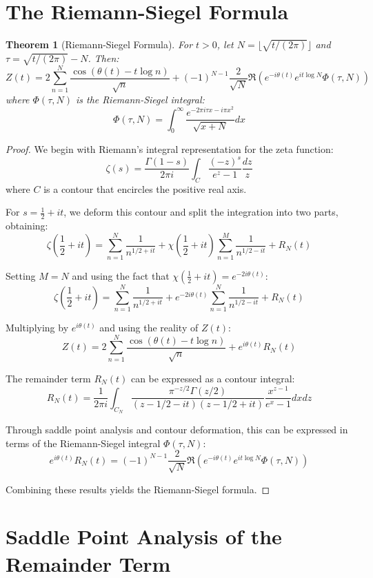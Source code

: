 \documentclass{article}
\newtheorem{theorem}{Theorem}
\begin{document}
\section{The Riemann-Siegel Formula}

\begin{theorem}[Riemann-Siegel Formula]
For $t > 0$, let $N = \lfloor\sqrt{t/(2\pi)}\rfloor$ and $\tau = \sqrt{t/(2\pi)} - N$. Then:
\[
Z(t) = 2\sum_{n=1}^N \frac{\cos(\theta(t) - t\log n)}{\sqrt{n}} + (-1)^{N-1}\frac{2}{\sqrt{N}}\Re\left(e^{-i\theta(t)}e^{it\log N}\Phi(\tau, N)\right)
\]
where $\Phi(\tau, N)$ is the Riemann-Siegel integral:
\[
\Phi(\tau, N) = \int_0^{\infty}\frac{e^{-2\pi i\tau x - i\pi x^2}}{\sqrt{x + N}}dx
\]
\end{theorem}

\begin{proof}
We begin with Riemann's integral representation for the zeta function:
\[
\zeta(s) = \frac{\Gamma(1-s)}{2\pi i}\int_C \frac{(-z)^s}{e^z - 1}\frac{dz}{z}
\]
where $C$ is a contour that encircles the positive real axis.

For $s = \frac{1}{2} + it$, we deform this contour and split the integration into two parts, obtaining:
\[
\zeta\left(\frac{1}{2} + it\right) = \sum_{n=1}^N \frac{1}{n^{1/2 + it}} + \chi\left(\frac{1}{2} + it\right)\sum_{n=1}^{M}\frac{1}{n^{1/2 - it}} + R_N(t)
\]

Setting $M = N$ and using the fact that $\chi\left(\frac{1}{2} + it\right) = e^{-2i\theta(t)}$:
\[
\zeta\left(\frac{1}{2} + it\right) = \sum_{n=1}^N \frac{1}{n^{1/2 + it}} + e^{-2i\theta(t)}\sum_{n=1}^{N}\frac{1}{n^{1/2 - it}} + R_N(t)
\]

Multiplying by $e^{i\theta(t)}$ and using the reality of $Z(t)$:
\[
Z(t) = 2\sum_{n=1}^N \frac{\cos(\theta(t) - t\log n)}{\sqrt{n}} + e^{i\theta(t)}R_N(t)
\]

The remainder term $R_N(t)$ can be expressed as a contour integral:
\[
R_N(t) = \frac{1}{2\pi i}\int_{C_N} \frac{\pi^{-z/2}\Gamma(z/2)}{(z-1/2-it)(z-1/2+it)}\frac{x^{z-1}}{e^x-1}dxdz
\]

Through saddle point analysis and contour deformation, this can be expressed in terms of the Riemann-Siegel integral $\Phi(\tau, N)$:
\[
e^{i\theta(t)}R_N(t) = (-1)^{N-1}\frac{2}{\sqrt{N}}\Re\left(e^{-i\theta(t)}e^{it\log N}\Phi(\tau, N)\right)
\]

Combining these results yields the Riemann-Siegel formula.
\end{proof}

\section{Saddle Point Analysis of the Remainder Term}
\end{document}
